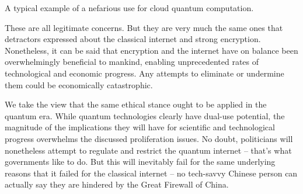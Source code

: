 \documentclass[aps, rmp, twocolumn, amsmath, amssymb, nofootinbib, superscriptaddress, longbibliography, floatfix, table-of-contents, eqsecnum]{revtex4-1}
\begin{document}
\begin{table}[!htb]
\caption{A typical example of a nefarious use for cloud quantum computation.} \label{alg:russian}
\end{table}


These are all legitimate concerns. But they are very much the same ones that detractors expressed about the classical internet and strong encryption. Nonetheless, it can be said that encryption and the internet have on balance been overwhelmingly beneficial to mankind, enabling unprecedented rates of technological and economic progress. Any attempts to eliminate or undermine them could be economically catastrophic.

We take the view that the same ethical stance ought to be applied in the quantum era. While quantum technologies clearly have dual-use potential, the magnitude of the implications they will have for scientific and technological progress overwhelms the discussed proliferation issues. No doubt, politicians will nonetheless attempt to regulate and restrict the quantum internet -- that's what governments like to do. But this will inevitably fail for the same underlying reasons that it failed for the classical internet -- no tech-savvy Chinese person can actually say they are hindered by the Great Firewall of China\texttrademark.
\end{document}
